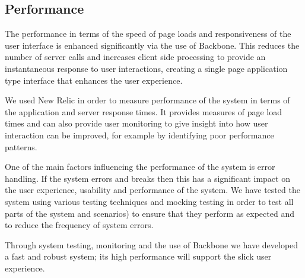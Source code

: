 \subsection{Performance}
The performance in terms of the speed of page loads and responsiveness of the user interface is enhanced significantly via the use of Backbone. This reduces the number of server calls and increases client side processing to provide an instantaneous response to user interactions, creating a single page application type interface that enhances the user experience. 

We used New Relic in order to measure performance of the system in terms of the application and server response times. It provides measures of page load times and can also provide user monitoring to give insight into how user interaction can be improved, for example by identifying poor performance patterns.

One of the main factors influencing the performance of the system is error handling. If the system errors and breaks then this has a significant impact on the user experience, usability and performance of the system. We have tested the system using various testing techniques and mocking testing in order to test all parts of the system and scenarios) to ensure that they perform as expected and to reduce the frequency of system errors.

Through system testing, monitoring and the use of Backbone we have developed a fast and robust system; its high performance will support the slick user experience.